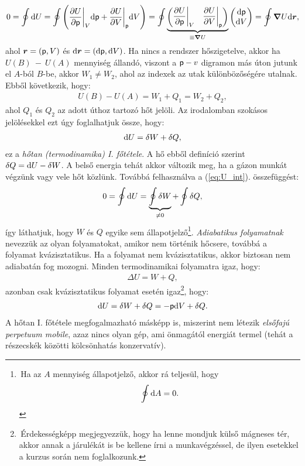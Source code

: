 \begin{align}\label{eq:U_int}
    0 = \oint \mathrm{d}U = \oint\left({\frac{\partial{U}}{\partial{\mathsf p}}\bigg|_V\mathrm{d}\mathsf p + \frac{\partial{U}}{\partial{V}}\bigg|_\mathsf p \mathrm{d}V}\right) = \oint
    \underbrace{\begin{pmatrix}
    \dfrac{\partial U}{\partial \mathsf p}\bigg|_V & \dfrac{\partial U}{\partial V}\bigg|_\mathsf p
    \end{pmatrix}}_{\equiv\bm\nabla U}
    \begin{pmatrix}
    \mathrm{d}\mathsf p \\ \mathrm{d}V
    \end{pmatrix} = \oint \bm\nabla U \mathrm{d}\bm r,
\end{align}
ahol $\bm r=(\mathsf p,V)$ és $\mathrm{d}\bm r = (\mathrm{d}\mathsf p, \mathrm{d}V)$.
Ha nincs a rendszer hőszigetelve, akkor ha $U(B)~{-}~U(A)$ mennyiség állandó, viszont a $\mathsf p-v$ digramon más úton jutunk el $A$-ból $B$-be, akkor $W_1\neq W_2$, ahol az indexek az utak különbözőségére utalnak. Ebből következik, hogy:
\begin{align}
    U(B)-U(A) = W_1+Q_1 = W_2+Q_2,
\end{align}
ahol $Q_1$ és $Q_2$ az adott úthoz tartozó hőt jelöli. Az irodalomban szokásos jelölésekkel ezt úgy foglalhatjuk össze, hogy:
\begin{align}
    \mathrm{d}U = \delta W + \delta Q,
\end{align}
ez a \emph{hőtan (termodinamika) I. főtétele}. A hő ebből definíció szerint $\delta Q = \mathrm{d}U-\delta W$. A belső energia tehát akkor változik meg, ha a gázon munkát végzünk vagy vele hőt közlünk. Továbbá felhasználva a (\ref{eq:U_int}). összefüggést:
\begin{align}
    0 = \oint \mathrm{d}U = \underbrace{\oint \delta W}_{\neq 0} + \oint \delta Q,
\end{align}
így láthatjuk, hogy $W$ és $Q$ egyike sem állapotjelző\footnote{\,Ha az $A$ mennyiség állapotjelző, akkor rá teljesül, hogy $$\oint \mathrm{d}A=0.$$}.
\emph{Adiabatikus folyamatnak} nevezzük az olyan folyamatokat, amikor nem történik hőcsere, továbbá a folyamat kvázisztatikus. Ha a folyamat nem kvázisztatikus, akkor biztosan nem adiabatán fog mozogni. Minden termodinamikai folyamatra igaz, hogy:
\begin{align}
    \Delta U = W +Q,
\end{align}
azonban csak kvázisztatikus folyamat esetén igaz\footnote{\,Érdekességképp megjegyezzük, hogy ha lenne mondjuk külső mágneses tér, akkor annak a járulékát is be kellene írni a munkavégzéssel, de ilyen esetekkel a kurzus során nem foglalkozunk.}, hogy:
\begin{align}
    \mathrm{d}U = \delta W+ \delta Q = -\mathsf p\mathrm{d}V +\delta Q.
\end{align}
A hőtan I. főtétele megfogalmazható másképp is, miszerint nem létezik \emph{elsőfajú perpetuum mobile}, azaz nincs olyan gép, ami önmagától energiát termel (tehát a részecskék közötti kölcsönhatás konzervatív).

